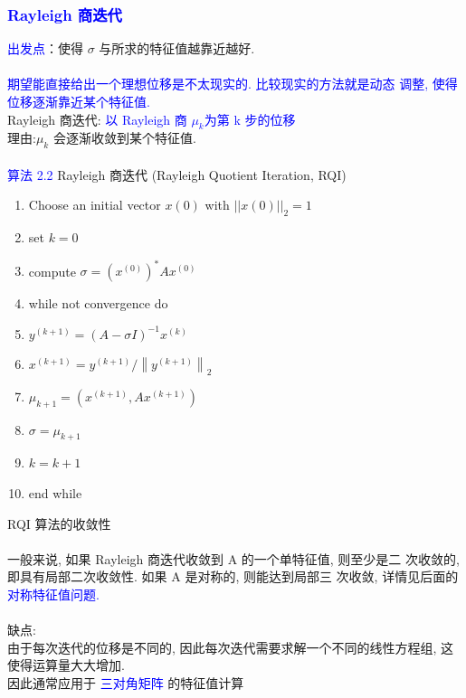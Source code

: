\documentclass[12pt,a4paper]{article}
\begin{document}
	\subsubsection{\textcolor{blue}{Rayleigh 商迭代}}
	\noindent \textcolor{blue}{出发点}：使得 $\sigma$ 与所求的特征值越靠近越好.\\
	\\
	\textcolor{blue}{期望能直接给出一个理想位移是不太现实的. 比较现实的方法就是动态 调整, 使得位移逐渐靠近某个特征值.}\\
	Rayleigh 商迭代: \textcolor{blue}{以 Rayleigh 商 $\mu_{k}$为第 k 步的位移}\\
	理由:$\mu_{k}$ 会逐渐收敛到某个特征值.\\
	\\
	\textcolor{blue}{算法 2.2} Rayleigh 商迭代 (Rayleigh Quotient Iteration, RQI)\\
	\begin{enumerate}
		\item Choose an initial vector $x(0)$ with $||x(0)||_{2} = 1$
		\item set $k=0$
		\item compute $\sigma=\left(x^{(0)}\right)^{*} A x^{(0)}$
		\item while not convergence do
		\item \qquad$y^{(k+1)} = (A-\sigma I)^{-1}x^{(k)}$
		\item \qquad$x^{(k+1)}=y^{(k+1)} /\left\|y^{(k+1)}\right\|_{2}$
		\item \qquad$\mu_{k+1}=\left(x^{(k+1)}, A x^{(k+1)}\right)$
		\item \qquad$\sigma=\mu_{k+1}$
		\item \qquad$k=k+1$
		\item end while
	\end{enumerate}
	RQI 算法的收敛性\\
	\\
	一般来说, 如果 Rayleigh 商迭代收敛到 A 的一个单特征值, 则至少是二 次收敛的, 即具有局部二次收敛性. 如果 A 是对称的, 则能达到局部三 次收敛, 详情见后面的\textcolor{blue}{对称特征值问题.}\\
	\\
	缺点:\\
	由于每次迭代的位移是不同的, 因此每次迭代需要求解一个不同的线性方程组, 这使得运算量大大增加. \\
	因此通常应用于 \textcolor{blue}{三对角矩阵} 的特征值计算
\end{document}
